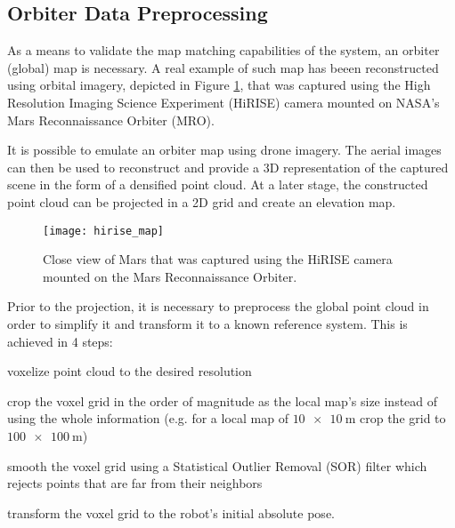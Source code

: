 
\subsection{Orbiter Data Preprocessing}

As a means to validate the map matching capabilities of the system,
an orbiter (global) map is necessary.
A real example of such map has beeen reconstructed using orbital imagery,
depicted in Figure \ref{fig:hirise_map}, that was captured using the
High Resolution Imaging Science Experiment (HiRISE) camera mounted
on NASA's Mars Reconnaissance Orbiter (MRO).

It is possible to emulate an orbiter map using drone imagery.
The aerial images can then be used to reconstruct and provide a 3D
representation of the captured scene in the form of a densified point cloud.
At a later stage, the constructed point cloud can be projected in a 2D
grid and create an elevation map.

\begin{figure}[h!]
    \centering
    \texttt{[image: hirise\_map]}
    \decoRule
    \caption[Mars view from HiRISE]{
        Close view of Mars that was captured using the HiRISE camera
        mounted on the Mars Reconnaissance Orbiter.
    }
    \label{fig:hirise_map}
\end{figure}

Prior to the projection, it is necessary to preprocess the global point cloud
in order to simplify it and transform it to a known reference system.
This is achieved in 4 steps:
\begin{enumerate*}[label=(\roman*)]
    \item voxelize point cloud to the desired resolution
    \item crop the voxel grid in the order of magnitude as the local map's
        size instead of using the whole information
        (e.g. for a local map of $\SI{10 x 10}{\m}$ crop the grid to
        $\SI{100 x 100}{\m}$)
    \item smooth the voxel grid using a Statistical Outlier Removal (SOR)
        filter which rejects points that are far from their neighbors
    \item transform the voxel grid to the robot's initial absolute pose.
\end{enumerate*}


